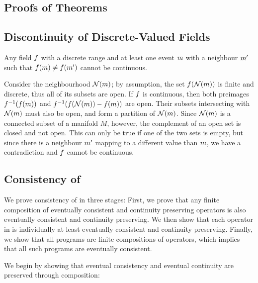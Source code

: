 \documentclass[12pt,a4paper,twoside,openright]{book}
\begin{document}
\begin{appendices}
\chapter{Proofs of Theorems}
\label{proofs}

\section{Discontinuity of Discrete-Valued Fields}

\begin{thm}
  Any field $f$ with a discrete range and at least one event $m$ with a neighbour $m'$ such that $f(m) \neq
  f(m')$ cannot be continuous.
\end{thm}
 Consider the neighbourhood $\mathcal{N}(m)$; by assumption, the set $f(\mathcal{N}(m))$ is finite and discrete, thus all of its subsets are open. 
 If $f$ is continuous, then both preimages $f^{-1}(f(m))$ and $f^{-1}(f(\mathcal{N}(m)) - f(m))$ are open.
 Their subsets intersecting with $\mathcal{N}(m)$ must also be open, and form a partition of $\mathcal{N}(m)$.  Since $\mathcal{N}(m)$ is a connected subset of a manifold $M$, however, the complement of an open set is closed and not open.
 This can only be true if one of the two sets is empty, but since there is a neighbour $m'$ mapping to a different value than $m$, we have a contradiction and $f$ cannot be continuous.


\section{Consistency of \calculus{}}
\label{app:consistency}

We prove consistency of \calculus{} in three stages: 
%
First, we prove that any finite composition of eventually consistent and continuity preserving operators is also eventually consistent and continuity preserving.
%
We then show that each operator in \calculus{} is individually at least eventually consistent and continuity preserving.  
%
Finally, we show that all \calculus{} programs are finite compositions of operators, which implies that all such programs are eventually consistent.

We begin by showing that eventual consistency and eventual continuity are preserved through composition:


\end{appendices}
\end{document}
